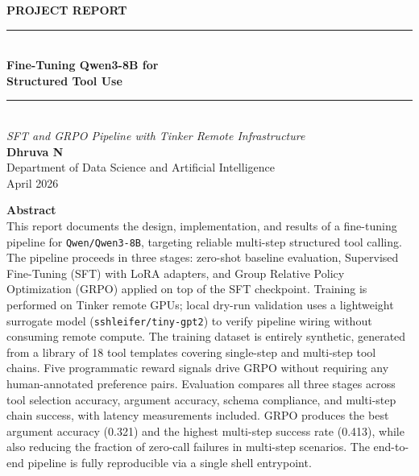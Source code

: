 \documentclass[12pt, a4paper]{article}
\begin{document}
\thispagestyle{empty}
\singlespacing
\vspace*{0.6cm}

\begin{center}
{\small\textbf{\MakeUppercase{Project Report}}}\\[6pt]
{\rule{\linewidth}{1pt}}\\[8pt]

{\LARGE\bfseries
Fine-Tuning Qwen3-8B for\\[4pt]
Structured Tool Use
}\\[8pt]
{\rule{\linewidth}{1pt}}\\[10pt]

{\large\textit{SFT and GRPO Pipeline with Tinker Remote Infrastructure}}\\[18pt]

{\large\textbf{Dhruva N}}\\[4pt]
{Department of Data Science and Artificial Intelligence}\\[4pt]
{April 2026}
\end{center}

\vspace{0.7cm}

\begin{abstractbox}
\textbf{Abstract}\\[6pt]
This report documents the design, implementation, and results of a fine-tuning pipeline
for \texttt{Qwen/Qwen3-8B}, targeting reliable multi-step structured tool calling. The
pipeline proceeds in three stages: zero-shot baseline evaluation, Supervised Fine-Tuning
(SFT) with LoRA adapters, and Group Relative Policy Optimization (GRPO) applied on top
of the SFT checkpoint. Training is performed on Tinker remote GPUs; local dry-run
validation uses a lightweight surrogate model (\texttt{sshleifer/tiny-gpt2}) to verify
pipeline wiring without consuming remote compute. The training dataset is entirely synthetic,
generated from a library of 18 tool templates covering single-step and multi-step tool
chains. Five programmatic reward signals drive GRPO without requiring any human-annotated
preference pairs. Evaluation compares all three stages across tool selection accuracy,
argument accuracy, schema compliance, and multi-step chain success, with latency measurements
included. GRPO produces the best argument accuracy (0.321) and the highest multi-step success
rate (0.413), while also reducing the fraction of zero-call failures in multi-step scenarios.
The end-to-end pipeline is fully reproducible via a single shell entrypoint.
\end{abstractbox}
\end{document}
